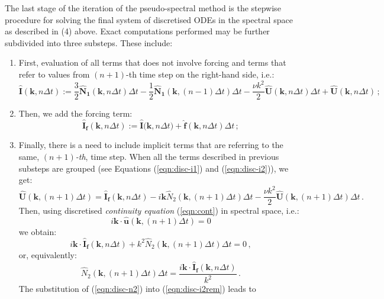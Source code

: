 \documentclass{pracamgren}
\begin{document}
The last stage of the iteration of the pseudo-spectral method is the stepwise procedure for solving the final system of discretised ODEs in the spectral space as described in (4) above.
Exact computations performed may be further subdivided into three substeps.
These include:
\begin{enumerate}
\item First, evaluation of all terms that does not involve forcing and terms that refer to values from $(n+1)$-th time step on the right-hand side, i.e.:
\begin{equation}
\label{eqn:disc-i1}
\mathbf{\hat{I}}(\mathbf{k}, n \Delta t) := \frac{3}{2} \mathbf{\hat{N}_1}(\mathbf{k}, n \Delta t) \Delta t - \frac{1}{2} \mathbf{\hat{N}_1}(\mathbf{k}, (n-1) \Delta t) \Delta t - \frac{\nu k^2}{2} \mathbf{\hat{U}}(\mathbf{k}, n \Delta t) \Delta t + \mathbf{\hat{U}}(\mathbf{k}, n \Delta t) \, ;
\end{equation}
\item Then, we add the forcing term:
\begin{equation}
\label{eqn:disc-i2}
\mathbf{\hat{I}_f}(\mathbf{k}, n \Delta t) := \mathbf{\hat{I}(\mathbf{k}}, n \Delta t) + \mathbf{\hat{f}}(\mathbf{k}, n \Delta t) \Delta t \, ;
\end{equation}
\item Finally, there is a need to include implicit terms that are referring to the same, $(n+1)$\emph{-th}, time step.
When all the terms described in previous substeps are grouped (see Equations (\ref{eqn:disc-i1}) and (\ref{eqn:disc-i2})), we get:
\begin{equation}
\label{eqn:disc-i2rem}
\mathbf{\hat{U}}(\mathbf{k}, (n+1) \Delta t) = \mathbf{\hat{I}_f}(\mathbf{k}, n \Delta t) - i \mathbf{k} \hat{N}_2 (\mathbf{k}, (n+1) \Delta t) \Delta t - \frac{\nu k^2}{2} \mathbf{\hat{U}}(\mathbf{k}, (n+1) \Delta t) \Delta t \, .
\end{equation}
Then, using discretised \emph{continuity equation} (\ref{eqn:cont}) in spectral space, i.e.:
$$ i \mathbf{k} \cdot \mathbf{\hat{u}}(\mathbf{k}, (n+1) \Delta t) = 0 $$
we obtain:
$$ i \mathbf{k} \cdot \mathbf{\hat{I}_f}(\mathbf{k}, n \Delta t) + k^2 \hat{N}_2 (\mathbf{k}, (n+1) \Delta t) \Delta t = 0 \, , $$
or, equivalently:
\begin{equation}
\label{eqn:disc-n2}
\hat{N}_2 (\mathbf{k}, (n+1) \Delta t) \Delta t = \frac{i \mathbf{k} \cdot \mathbf{\hat{I}_f}(\mathbf{k}, n \Delta t)}{k^2} \, .
\end{equation}
The substitution of (\ref{eqn:disc-n2}) into (\ref{eqn:disc-i2rem}) leads to

\end{enumerate}
\end{document}
